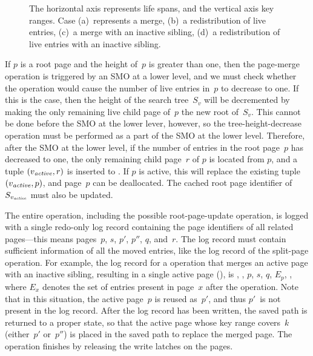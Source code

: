 \begin{figure}[tb]
\begin{center}
  {The horizontal axis represents life spans, and the vertical
  axis key ranges.
  Case 
  (a)~represents a merge, 
  (b)~a redistribution of live entries, 
  (c)~a merge with an inactive sibling,
  (d)~a redistribution of live entries with an inactive sibling.}
  \label{fig:merge-active}
\end{center}
\end{figure}

If $p$ is a root page and the height of~$p$ is greater than one, then the
page-merge operation is triggered by an SMO at a lower level, and we must
check whether the operation would cause the number of live entries in~$p$ to
decrease to one.
If this is the case, then the height of the search tree~$S_v$ will be
decremented by making the only remaining live child page of~$p$ the
new root of~$S_v$.
This cannot be done before the SMO at the lower lever, however, so the
tree-height-decrease operation must be performed as a part of the SMO at the
lower level.
Therefore, after the SMO at the lower level, if the number of entries in the
root page~$p$ has decreased to one, the only remaining child page~$r$ of $p$
is located from $p$, and a tuple $(\smash{v_{\text{\textit{active}}}}, r)$ is inserted to \rootstar.
If $p$ is active, this will replace the existing tuple $(\smash{v_{\text{\textit{active}}}}, p)$, and
page~$p$ can be deallocated.
The cached root page identifier of $S_{\smash{v_{\text{\textit{active}}}}}$ must also be updated.

The entire  operation, including the possible
root-page-update operation, is logged with a single redo-only log record
containing the page identifiers of all related pages---this means pages~$p$,
$s$, $p'$, $p''$, $q$, and~$r$.
The log record must contain sufficient information of all the moved
entries, like the log record of the split-page operation. 
For example, the log record for a  operation that merges an
active page with an inactive sibling, resulting in a single active page
(), is
, , $p$, $s$, $q$, $E_p$, ,
where $E_x$ denotes the set of entries present in page~$x$ after the
operation. 
Note that in this situation, the active page~$p$ is reused as~$p'$, and thus
$p'$~is not present in the log record.
After the log record has been written, the saved path is returned to a proper
state, so that the active page whose key range covers~$k$ (either~$p'$
or~$p''$) is placed in the saved path to replace the merged page.
The operation finishes by releasing the write latches on the pages.

